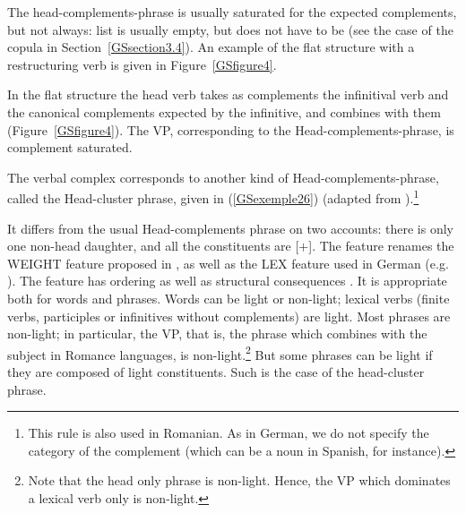 \documentclass[output=paper
                ,modfonts
                ,nonflat
	        ,collection
	        ,collectionchapter
	        ,collectiontoclongg
 	        ,biblatex
                ,babelshorthands
                ,newtxmath
                ,draftmode
                ,colorlinks, citecolor=brown
]{./langsci/langscibook}
\begin{document}
{%



The head-complements-phrase is usually saturated for the expected complements, but not always: list  is usually empty, but does not have to be (see the case of the copula in Section~\ref{GSsection3.4}). An example of the flat structure with a restructuring verb is given in Figure~\ref{GSfigure4}.


In the flat structure the head verb takes as complements the infinitival verb and the canonical complements expected by the infinitive, and combines with them (Figure~\ref{GSfigure4}). The VP, corresponding to the Head-complements-phrase, is complement saturated.

The verbal complex corresponds to another kind of Head-complements-phrase, called the Head-cluster phrase, given in (\ref{GSexemple26}) (adapted from \citealt{muller2018clause}).\footnote{This rule is also used in Romanian. As in German, we do not specify the category of the complement (which can be a noun in Spanish, for instance).} 

\begin{exe}
\end{exe}

It differs from the usual Head-complements phrase on two accounts: there is only one non-head daughter, and all the constituents are [\light $+$]. The \light feature \citep{bonami2012phrase} renames the WEIGHT feature proposed in \cite{abeille2000french}, as well as the LEX feature used in German (e.g. \citealt{HN89b, HN94a, Kiss95a, Meurers2000b-Short, Mueller2002b, hohle2018spuren}). The \light feature has ordering as well as structural consequences \citep{abeille2000french, AG2010}. It is appropriate both for words and phrases. Words can be light or non-light; lexical verbs (finite verbs, participles or infinitives without complements) are light. Most phrases are non-light; in particular, the VP, that is, the phrase which combines with the subject in Romance languages, is non-light.\footnote{Note that the head only phrase is non-light. Hence, the VP which dominates a lexical verb only is non-light.} But some phrases can be light if they are composed of light constituents. Such is the case of the head-cluster phrase. 

}
\end{document}
